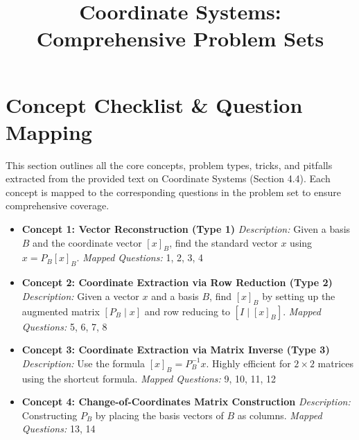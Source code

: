 \documentclass{article}
\title{Coordinate Systems: Comprehensive Problem Sets}
\author{}
\date{}
\begin{document}
\maketitle
\tableofcontents
\newpage

\section{Concept Checklist \& Question Mapping}
This section outlines all the core concepts, problem types, tricks, and pitfalls extracted from the provided text on Coordinate Systems (Section 4.4). Each concept is mapped to the corresponding questions in the problem set to ensure comprehensive coverage.

\begin{itemize}
    \item \textbf{Concept 1: Vector Reconstruction (Type 1)} 
    \newline \textit{Description:} Given a basis $B$ and the coordinate vector $[x]_B$, find the standard vector $x$ using $x = P_B[x]_B$.
    \newline \textit{Mapped Questions:} 1, 2, 3, 4
    
    \item \textbf{Concept 2: Coordinate Extraction via Row Reduction (Type 2)}
    \newline \textit{Description:} Given a vector $x$ and a basis $B$, find $[x]_B$ by setting up the augmented matrix $[P_B \mid x]$ and row reducing to $[I \mid [x]_B]$.
    \newline \textit{Mapped Questions:} 5, 6, 7, 8
    
    \item \textbf{Concept 3: Coordinate Extraction via Matrix Inverse (Type 3)}
    \newline \textit{Description:} Use the formula $[x]_B = P_B^{-1}x$. Highly efficient for $2 \times 2$ matrices using the shortcut formula.
    \newline \textit{Mapped Questions:} 9, 10, 11, 12
    
    \item \textbf{Concept 4: Change-of-Coordinates Matrix Construction}
    \newline \textit{Description:} Constructing $P_B$ by placing the basis vectors of $B$ as columns.
    \newline \textit{Mapped Questions:} 13, 14
    

\end{itemize}
\end{document}

